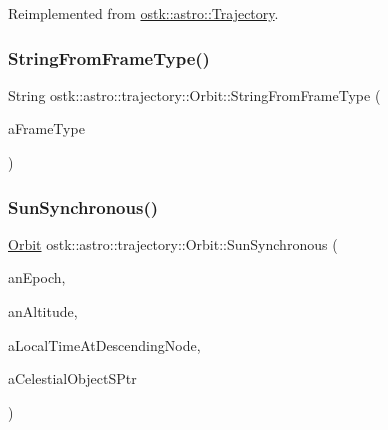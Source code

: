 Reimplemented from \hyperlink{classostk_1_1astro_1_1_trajectory_aac11fb7c53f4cf970f52f681a75c5261}{ostk\+::astro\+::\+Trajectory}.

\mbox{\label{classostk_1_1astro_1_1trajectory_1_1_orbit_a329934037eb9eb4cacfcb2a5774753ed}} 
\subsubsection{\texorpdfstring{String\+From\+Frame\+Type()}{StringFromFrameType()}}
{\footnotesize\ttfamily String ostk\+::astro\+::trajectory\+::\+Orbit\+::\+String\+From\+Frame\+Type (\begin{DoxyParamCaption}\item[{const \hyperlink{classostk_1_1astro_1_1trajectory_1_1_orbit_a1cc449ad56374471a8ab4300dde979e7}{Orbit\+::\+Frame\+Type} \&}]{a\+Frame\+Type }\end{DoxyParamCaption})\hspace{0.3cm}{\ttfamily [static]}}

\mbox{\label{classostk_1_1astro_1_1trajectory_1_1_orbit_aaf0e7e3140ba78c06cc590f37ba680a5}} 
\subsubsection{\texorpdfstring{Sun\+Synchronous()}{SunSynchronous()}}
{\footnotesize\ttfamily \hyperlink{classostk_1_1astro_1_1trajectory_1_1_orbit}{Orbit} ostk\+::astro\+::trajectory\+::\+Orbit\+::\+Sun\+Synchronous (\begin{DoxyParamCaption}\item[{const Instant \&}]{an\+Epoch,  }\item[{const Length \&}]{an\+Altitude,  }\item[{const Time \&}]{a\+Local\+Time\+At\+Descending\+Node,  }\item[{const Shared$<$ const Celestial $>$ \&}]{a\+Celestial\+Object\+S\+Ptr }\end{DoxyParamCaption})\hspace{0.3cm}{\ttfamily [static]}}



